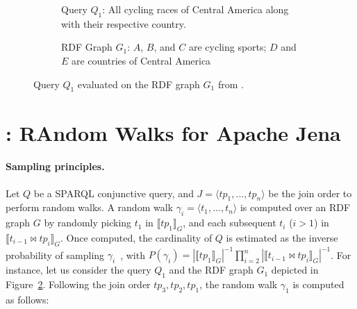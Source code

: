 
\begin{figure}
  \setlength{\fboxsep}{0pt} %
  \begin{subfigure}{0.48\textwidth}
    \caption{\label{fig:q1-j2-1hop}Query $Q_1$: All cycling races of Central America along
      with their respective country.}
  \end{subfigure}
  \hfill
  \begin{subfigure}{0.48\textwidth}
    \fbox{%
      \resizebox{\textwidth}{!}{%
        
    }}
    \caption{RDF Graph $G_1$: $A$, $B$, and $C$ are cycling sports; $D$ and $E$
      are countries of Central America~\cite{10.1007/978-3-031-33455-9_3}}
  \end{subfigure}
  \caption{\label{fig:random_walks_example} Query $Q_1$ evaluated on the RDF graph $G_1$ from \cite{10.1007/978-3-031-33455-9_3}.
    }
\end{figure}

\section{\NAME: RAndom Walks for Apache Jena}
\label{sec:proposal}

\paragraph{Sampling principles.}

Let $Q$ be a SPARQL conjunctive query, and $J = \langle tp_1, ..., tp_n \rangle$ be
the join order to perform random walks. A random walk
$\gamma_i = \langle t_1, ..., t_n\rangle$ is computed over
an RDF graph $G$ by randomly picking $t_1$ in $\llbracket tp_1 \rrbracket_G$,
and each subsequent $t_i$ ($i > 1$) in $\llbracket t_{i-1} \bowtie tp_i \rrbracket_G$.
Once computed, the cardinality of $Q$ is estimated as  the inverse probability
of sampling $\gamma_i$~\cite{li2019wanderjoin}, with $P(\gamma_i) = |\llbracket tp_1 \rrbracket_G|^{-1} \prod_{i=2}^{n}
|\llbracket t_{i-1} \bowtie tp_i \rrbracket_G|^{-1}$.
%
For instance, let us consider the query $Q_1$ and the RDF graph $G_1$
depicted in Figure~\ref{fig:random_walks_example}. Following the join order $tp_3,tp_2,tp_1$, the random walk 
$\gamma_1$ is computed as follows:

